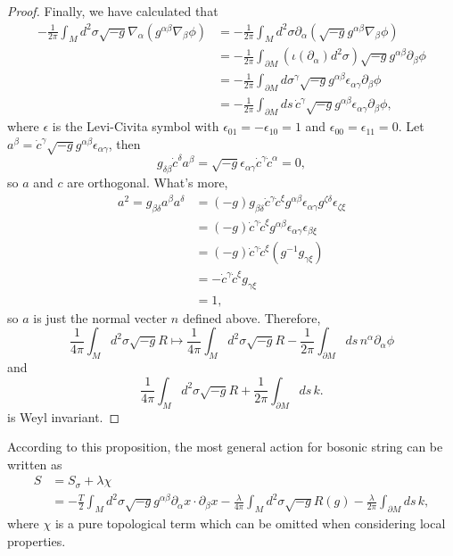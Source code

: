 \begin{proof}
Finally, we have calculated that
\begin{align*}
	-\frac{1}{2\pi}\int_Md^2\sigma \sqrt{-g}
	\nabla_\alpha(g^{\alpha\beta}\nabla_\beta \phi)
	&=-\frac{1}{2\pi}\int_Md^2\sigma
	\partial_\alpha(\sqrt{-g} g^{\alpha\beta}\nabla_\beta \phi)\\
	&=-\frac{1}{2\pi}\int_{\partial M}
	(\iota({\partial_\alpha})d^2\sigma)
\sqrt{-g} g^{\alpha\beta}\partial_\beta \phi\\
&=-\frac{1}{2\pi}\int_{\partial M}
	d\sigma^\gamma \sqrt{-g} g^{\alpha\beta}\epsilon_{\alpha\gamma}
 \partial_\beta \phi\\
&=-\frac{1}{2\pi}\int_{\partial M}
ds \,\dot c^\gamma \sqrt{-g} g^{\alpha\beta}\epsilon_{\alpha\gamma}
\partial_\beta \phi,
\end{align*}
where $\epsilon$ is the Levi-Civita symbol with 
$\epsilon_{01}=-\epsilon_{10}=1$ and $\epsilon_{00}=\epsilon_{11}=0$. 
Let $a^\beta=\dot c^\gamma \sqrt{-g} g^{\alpha\beta}\epsilon_{\alpha\gamma}$, then 
\[
	g_{\delta\beta}\dot c^\delta a^\beta=\sqrt{-g}\epsilon_{\alpha\gamma}\dot c^\gamma\dot c^\alpha=0,
\]
so $a$ and $c$ are orthogonal. What's more,
\begin{align*}
	a^2=g_{\beta\delta}a^\beta a^\delta &=
	(-g)g_{\beta\delta}\dot c^\gamma \dot c^\xi  
	g^{\alpha\beta}\epsilon_{\alpha\gamma}
	g^{\zeta\delta}\epsilon_{\zeta\xi}\\
	&=(-g)\dot c^\gamma \dot c^\xi  
	g^{\alpha\beta}\epsilon_{\alpha\gamma}
	\epsilon_{\beta\xi}\\
	&=(-g)\dot c^\gamma \dot c^\xi
	(g^{-1}g_{\gamma\xi})\\
	&=-\dot c^\gamma \dot c^\xi g_{\gamma\xi}\\
	&=1,
\end{align*}
so $a$ is just the normal vecter $n$ defined above. Therefore,
\[
	\frac{1}{4\pi} \int_M d^2\sigma \sqrt{-g} R
	\longmapsto 
	\frac{1}{4\pi} \int_M d^2\sigma \sqrt{-g} R
	-\frac{1}{2\pi}\int_{\partial M}ds \, n^\alpha
\partial_\alpha\phi
\]
and 
\[
	\frac{1}{4\pi} \int_M d^2\sigma \sqrt{-g} R+
	\frac{1}{2\pi}\int_{\partial M}ds\, k.
\]
is Weyl invariant.
\end{proof}

According to this proposition, the most
general action for bosonic string can be written as
\begin{align*}
	S&=S_\sigma+\lambda \chi\\
&=-\frac{T}{2} \int_M d^2\sigma \sqrt{-g}
g^{\alpha\beta}\partial_\alpha x\cdot \partial_\beta x
-\frac{\lambda}{4\pi} \int_M d^2\sigma \sqrt{-g} R(g)-
\frac{\lambda}{2\pi}\int_{\partial M}ds\, k,
\end{align*}
where $\chi$ is a pure topological term which can be 
omitted when considering local properties.